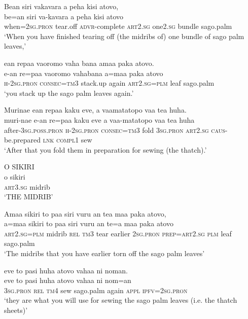 \ea\label{ex:text2-16}
Bean siri vakavara a peha kisi atovo,\\
\gll be=an	siri	va-kavara	a	peha	kisi	atovo\\
     when=2\textsc{sg}.\textsc{pron}	tear.off	\textsc{advr}-complete	\textsc{art}2.\textsc{sg}	one2.\textsc{sg}	bundle	sago.palm\\
\glt `When you have finished tearing off (the midribs of) one bundle of sago palm leaves,'
\z

\ea\label{ex:text2-17}
ean repaa vaoromo vaha bana amaa paka atovo.\\
\gll e-an	re=paa	vaoromo	vahabana	a=maa	paka	atovo\\
     \textsc{h}-2\textsc{sg}.\textsc{pron}	\textsc{consec}=\textsc{tm}3	stack.up	again	\textsc{art}2.\textsc{sg}=\textsc{plm}	leaf	sago.palm\\
\glt `you stack up the sago palm leaves again.'
\z

\ea\label{ex:text2-18}
Murinae ean repaa kaku eve, a vaamatatopo vaa tea huha.\\
\gll muri-nae	e-an	re=paa	kaku	eve	a	vaa-matatopo	vaa	tea	huha\\
     after-3\textsc{sg}.\textsc{poss}.\textsc{pron}	\textsc{h}-2\textsc{sg}.\textsc{pron}	\textsc{consec}=\textsc{tm}3	fold	3\textsc{sg}.\textsc{pron}	\textsc{art}2.\textsc{sg}	\textsc{caus}-be.prepared	\textsc{lnk}	\textsc{compl}1	sew\\
\glt `After that you fold them in preparation for sewing (the thatch).'
\z

\ea\label{ex:text2-19}
O SIKIRI\\
\gll o	sikiri\\
     \textsc{art}3.\textsc{sg}	midrib\\
\glt `THE MIDRIB'
\z

\ea\label{ex:text2-20}
Amaa sikiri to paa siri vuru an tea maa paka atovo,\\
\gll a=maa	sikiri	to	paa	siri	vuru	an	te=a	maa	paka	atovo\\
     \textsc{art}2.\textsc{sg}=\textsc{plm}	midrib	\textsc{rel}	\textsc{tm}3	tear	earlier	2\textsc{sg}.\textsc{pron}	\textsc{prep}=\textsc{art}2.\textsc{sg}	\textsc{plm}	leaf	sago.palm\\
\glt `The midribs that you have earlier torn off the sago palm leaves'
\z

\ea\label{ex:text2-21}
eve to pasi huha atovo vahaa ni noman.\\
\gll eve	to	pasi	huha	atovo	vahaa	ni	nom=an\\
     3\textsc{sg}.\textsc{pron}	\textsc{rel}	\textsc{tm}4	sew	sago.palm	again	\textsc{appl}	\textsc{ipfv}=2\textsc{sg}.\textsc{pron}\\
\glt `they are what you will use for sewing the sago palm leaves (i.e. the thatch sheets)'
\z

